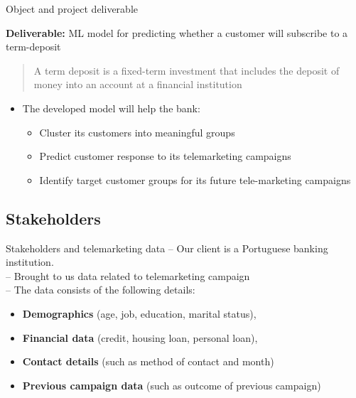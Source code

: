 \begin{frame}{Object and project deliverable}

\textbf{Deliverable:} ML model for predicting whether a customer will subscribe to a term-deposit
 \begin{quote} A term deposit is a fixed-term investment that includes the deposit of money into an account at a financial institution
 \end{quote}
\begin{itemize}
	\item The developed model will help the bank:
	\begin{itemize}
	    \item Cluster its customers into meaningful groups
	    \item Predict customer response to its telemarketing campaigns
	    \item Identify target customer groups for its future tele-marketing campaigns
	\end{itemize}
	
\end{itemize}

		


\end{frame}

\subsection{Stakeholders}
\begin{frame}{Stakeholders and telemarketing data}
-- Our client is a Portuguese banking institution.\\
-- Brought to us data related to telemarketing campaign\\
-- The data consists of the following details:\\
\linespread{1.3}
\begin{itemize}
    \item \textbf{Demographics} (age, job, education, marital status),
    \item \textbf{Financial data} (credit, housing loan, personal loan),
	\item \textbf{Contact details} (such as method of contact and month)
	\item \textbf{Previous campaign data} (such as outcome of previous campaign)
\end{itemize}
\end{frame}


